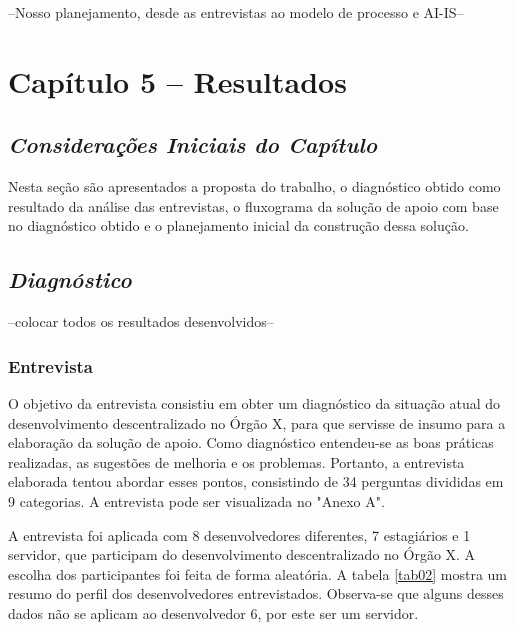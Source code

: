 --Nosso planejamento, desde as entrevistas ao modelo de processo e AI-IS--

\chapter[Metodologia]{Capítulo 5 – Resultados}

\section{\textit{Considerações Iniciais do Capítulo}}

Nesta seção são apresentados a proposta do trabalho, o diagnóstico obtido como resultado da análise das entrevistas, o fluxograma da solução de apoio com base no diagnóstico obtido e o planejamento inicial da construção dessa solução.

\section{\textit{Diagnóstico}}

--colocar todos os resultados desenvolvidos--

\subsection{Entrevista}

O objetivo da entrevista consistiu em obter um diagnóstico da situação atual do desenvolvimento descentralizado no Órgão X, para que servisse de insumo para a elaboração da solução de apoio. Como diagnóstico entendeu-se as boas práticas realizadas, as sugestões de melhoria e os problemas. Portanto, a entrevista elaborada tentou abordar esses pontos, consistindo de 34 perguntas divididas em 9 categorias. A entrevista pode ser visualizada no "Anexo A".

A entrevista foi aplicada com 8 desenvolvedores diferentes, 7 estagiários e 1 servidor, que participam do desenvolvimento descentralizado no Órgão X. A escolha dos participantes foi feita de forma aleatória. A tabela \ref{tab02} mostra um resumo do perfil dos desenvolvedores entrevistados. Observa-se que alguns desses dados não se aplicam ao desenvolvedor 6, por este ser um servidor.\newline

